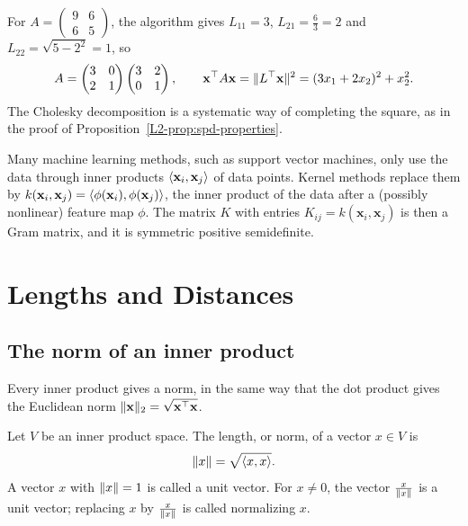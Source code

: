 \begin{example}\label{L2-ex:cholesky}
    For $A = \begin{pmatrix} 9 & 6 \\ 6 & 5 \end{pmatrix}$, the algorithm gives $L_{11} = 3$, $L_{21} = \frac{6}{3} = 2$ and $L_{22} = \sqrt{5 - 2^2} = 1$, so
    \[A = \begin{pmatrix} 3 & 0 \\ 2 & 1 \end{pmatrix}\begin{pmatrix} 3 & 2 \\ 0 & 1 \end{pmatrix}, \qquad \mathbf{x}^\top A\mathbf{x} = \lVert L^\top\mathbf{x} \rVert^2 = (3x_1 + 2x_2)^2 + x_2^2.\]
    The Cholesky decomposition is a systematic way of completing the square, as in the proof of Proposition~\ref{L2-prop:spd-properties}.
\end{example}

\begin{remark}[Kernels]
    Many machine learning methods, such as support vector machines, only use the data through inner products $\langle \mathbf{x}_i, \mathbf{x}_j \rangle$ of data points. Kernel methods replace them by $k(\mathbf{x}_i, \mathbf{x}_j) = \langle \phi(\mathbf{x}_i), \phi(\mathbf{x}_j) \rangle$, the inner product of the data after a (possibly nonlinear) feature map $\phi$. The matrix $K$ with entries $K_{ij} = k(\mathbf{x}_i, \mathbf{x}_j)$ is then a Gram matrix, and it is symmetric positive semidefinite.
\end{remark}

\section{Lengths and Distances}\label{L2-sec:lengths}

\subsection{The norm of an inner product}

Every inner product gives a norm, in the same way that the dot product gives the Euclidean norm $\lVert \mathbf{x} \rVert_2 = \sqrt{\mathbf{x}^\top \mathbf{x}}$.

\begin{definition}
    Let $V$ be an inner product space. The length, or norm, of a vector $x \in V$ is
    \[\lVert x \rVert = \sqrt{\langle x, x \rangle}.\]
    A vector $x$ with $\lVert x \rVert = 1$ is called a unit vector. For $x \neq 0$, the vector $\frac{x}{\lVert x \rVert}$ is a unit vector; replacing $x$ by $\frac{x}{\lVert x \rVert}$ is called normalizing $x$.
\end{definition}

